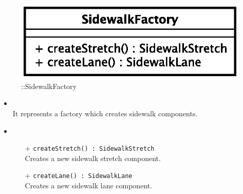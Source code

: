 \begin{figure}[h]
\centering
\includegraphics[scale=0.6,keepaspectratio]{images/solution/app/backend/sidewalk_factory.eps}
\caption{\pReactiveFactory::SidewalkFactory}
\label{fig:sd-app-sidewalk-factory}
\end{figure}
\FloatBarrier
\begin{itemize}
  \item \textbf{\descr} \\
It represents a factory which creates sidewalk components.
  \item \textbf{\ops} \\
  \begin{itemize} 
    \item[+] \texttt{createStretch() : SidewalkStretch} \\
Creates a new sidewalk stretch component.
    \item[+] \texttt{createLane() : SidewalkLane} \\
Creates a new sidewalk lane component.
  \end{itemize}
\end{itemize}
